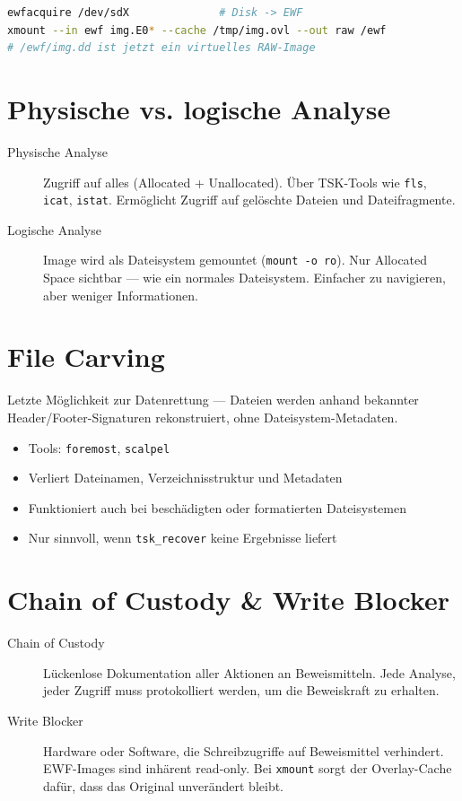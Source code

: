 \begin{lstlisting}[language=bash]
ewfacquire /dev/sdX              # Disk -> EWF
xmount --in ewf img.E0* --cache /tmp/img.ovl --out raw /ewf
# /ewf/img.dd ist jetzt ein virtuelles RAW-Image
\end{lstlisting}

\section{Physische vs. logische Analyse}

\begin{description}
	\item[Physische Analyse] Zugriff auf alles (Allocated + Unallocated).
		Über TSK-Tools wie \texttt{fls}, \texttt{icat}, \texttt{istat}.
		Ermöglicht Zugriff auf gelöschte Dateien und Dateifragmente.
	\item[Logische Analyse] Image wird als Dateisystem gemountet (\texttt{mount -o ro}).
		Nur Allocated Space sichtbar — wie ein normales Dateisystem.
		Einfacher zu navigieren, aber weniger Informationen.
\end{description}

\section{File Carving}

Letzte Möglichkeit zur Datenrettung — Dateien werden anhand bekannter Header/Footer-Signaturen rekonstruiert, ohne Dateisystem-Metadaten.

\begin{itemize}
	\item Tools: \texttt{foremost}, \texttt{scalpel}
	\item Verliert Dateinamen, Verzeichnisstruktur und Metadaten
	\item Funktioniert auch bei beschädigten oder formatierten Dateisystemen
	\item Nur sinnvoll, wenn \texttt{tsk\_recover} keine Ergebnisse liefert
\end{itemize}

\section{Chain of Custody \& Write Blocker}

\begin{description}
	\item[Chain of Custody] Lückenlose Dokumentation aller Aktionen an Beweismitteln.
		Jede Analyse, jeder Zugriff muss protokolliert werden, um die Beweiskraft zu erhalten.
	\item[Write Blocker] Hardware oder Software, die Schreibzugriffe auf Beweismittel verhindert.
		EWF-Images sind inhärent read-only.
		Bei \texttt{xmount} sorgt der Overlay-Cache dafür, dass das Original unverändert bleibt.
\end{description}

